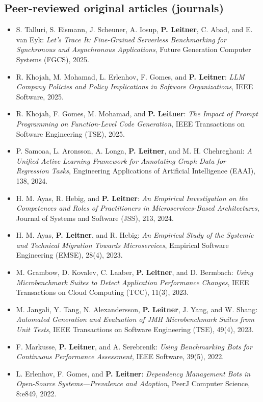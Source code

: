 \documentclass[a4paper,11pt]{article}
\begin{document}
\subsection{Peer-reviewed original articles (journals)}

\begin{itemize}[itemsep=0.2em]
\item S. Talluri, S. Eismann, J. Scheuner, A. Iosup, \textbf{P. Leitner}, C. Abad, and E. van Eyk: \emph{Let's Trace It: Fine-Grained Serverless Benchmarking for Synchronous and Asynchronous Applications}, Future Generation Computer Systems (FGCS), 2025.
\item R. Khojah, M. Mohamad, L. Erlenhov, F. Gomes, and \textbf{P. Leitner}: \emph{LLM Company Policies and Policy Implications in Software Organizations}, IEEE Software, 2025.
\item R. Khojah, F. Gomes, M. Mohamad, and \textbf{P. Leitner}: \emph{The Impact of Prompt Programming on Function-Level Code Generation}, IEEE Transactions on Software Engineering (TSE), 2025.
\item P. Samoaa, L. Aronsson, A. Longa, \textbf{P. Leitner}, and M. H. Chehreghani: \emph{A Unified Active Learning Framework for Annotating Graph Data for Regression Tasks}, Engineering Applications of Artificial Intelligence (EAAI), 138, 2024.
\item H. M. Ayas, R. Hebig, and \textbf{P. Leitner}: \emph{An Empirical Investigation on the Competences and Roles of Practitioners in Microservices-Based Architectures}, Journal of Systems and Software (JSS), 213, 2024.
\item H. M. Ayas, \textbf{P. Leitner}, and R. Hebig: \emph{An Empirical Study of the Systemic and Technical Migration Towards Microservices}, Empirical Software Engineering (EMSE), 28(4), 2023.
\item M. Grambow, D. Kovalev, C. Laaber, \textbf{P. Leitner}, and D. Bermbach: \emph{Using Microbenchmark Suites to Detect Application Performance Changes}, IEEE Transactions on Cloud Computing (TCC), 11(3), 2023.
\item M. Jangali, Y. Tang, N. Alexandersson, \textbf{P. Leitner}, J. Yang, and W. Shang: \emph{Automated Generation and Evaluation of JMH Microbenchmark Suites from Unit Tests}, IEEE Transactions on Software Engineering (TSE), 49(4), 2023.
\item F. Markusse, \textbf{P. Leitner}, and A. Serebrenik: \emph{Using Benchmarking Bots for Continuous Performance Assessment}, IEEE Software, 39(5), 2022.
\item L. Erlenhov, F. Gomes, and \textbf{P. Leitner}: \emph{Dependency Management Bots in Open-Source Systems---Prevalence and Adoption}, PeerJ Computer Science, 8:e849, 2022.

\end{itemize}
\end{document}
